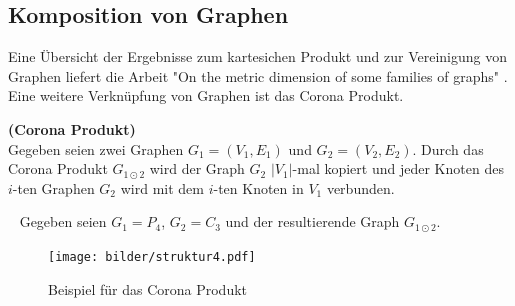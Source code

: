 \subsection{Komposition von Graphen}
Eine Übersicht der Ergebnisse zum kartesichen Produkt und zur Vereinigung von Graphen liefert die Arbeit "On the metric dimension of some families of graphs" \cite{families}. Eine weitere Verknüpfung von Graphen ist das Corona Produkt.

\begin{defi}{\textbf{(Corona Produkt)}}\\
Gegeben seien zwei Graphen $G_1=(V_1,E_1)$ und $G_2=(V_2,E_2)$. Durch das Corona Produkt $G_{1 \odot 2}$ wird der Graph $G_2$ $|V_1|$-mal kopiert und jeder Knoten des $i$-ten Graphen $G_2$ wird mit dem $i$-ten Knoten in $V_1$ verbunden.
\end{defi}
\begin{bsp} ~ \newline
Gegeben seien $G_1=P_4$, $G_2=C_3$ und der resultierende Graph $G_{1 \odot 2}$.\newline
\vspace{-1mm}
\begin{figure}[ht]
		\centering 		 
   \texttt{[image: bilder/struktur4.pdf]}
	\caption{Beispiel für das Corona Produkt}
  	 \label{bild:vereinigung}
  	 \end{figure}
  	 \vspace{-7mm}
  	 ~\linebreak
\end{bsp}
